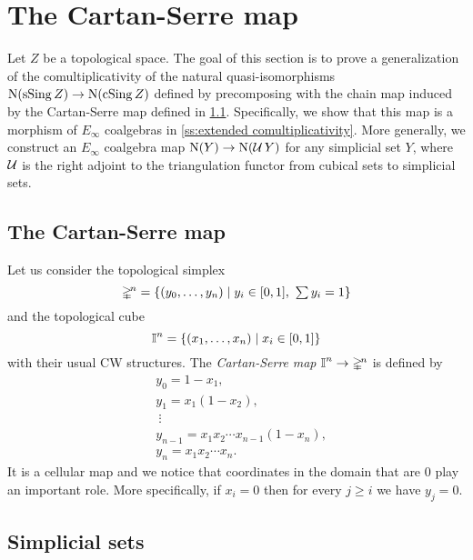 
\section{The Cartan-Serre map} \label{s:the cartan-serre map}

Let $Z$ be a topological space.
The goal of this section is to prove a generalization of the comultiplicativity of the natural quasi-isomorphisms $\operatorname{N}(\operatorname{sSing} Z) \to \operatorname{N}(\operatorname{cSing} Z)$ defined by precomposing with the chain map induced by the Cartan-Serre map defined in \cref{ss:the cartan-serre map}.
Specifically, we show that this map is a morphism of $E_\infty$ coalgebras in \cref{ss:extended comultiplicativity}.
More generally, we construct an $E_\infty$ coalgebra map $\operatorname{N}(Y) \to \operatorname{N}(\operatorname{\mathcal{U}} Y)$ for any simplicial set $Y$, where $\operatorname{\mathcal{U}}$ is the right adjoint to the triangulation functor from cubical sets to simplicial sets.

\subsection{The Cartan-Serre map} \label{ss:the cartan-serre map}

Let us consider the topological simplex
\begin{equation*}
\mathbb{\Delta}^{\!n} = \{(y_0, \dots, y_n) \mid y_i \in [0,1], \ \textstyle{\sum} \, y_i = 1\}
\end{equation*}
and the topological cube
\begin{equation*}
\bm{\mathbb{I}}^{n} = \{(x_1, \dots, x_n) \mid x_i \in [0,1]\}
\end{equation*}
with their usual CW structures.
The \textit{Cartan-Serre} \textit{map} $\bm{\mathbb{I}}^n \to \mathbb{\Delta}^{\!n}$ is defined by
\begin{equation} \label{e:cartan-serre CW map}
\begin{split}
&y_0 = 1 - x_1, \\
&y_1 = x_1(1 - x_2), \\
&\ \vdots \\
&y_{n-1} = x_1 x_2 \cdots x_{n-1}(1-x_n), \\
&y_{n} = x_1 x_2 \cdots x_n.
\end{split}
\end{equation}
It is a cellular map and we notice that coordinates in the domain that are $0$ play an important role.
More specifically, if $x_i = 0$ then for every $j \geq i$ we have $y_{j} = 0$.

\subsection{Simplicial sets} \label{ss:simplicial sets}

